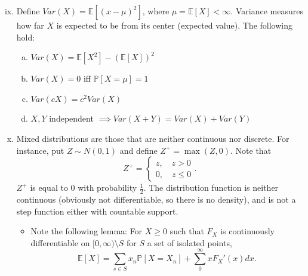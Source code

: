 \documentclass{tufte-handout}
\newcommand*\E{\mathbb{E}}
\renewcommand{\P}{\mathbb{P}}
\theoremstyle{definition}
\begin{document}
\begin{enumerate}[(i)]
	\setcounter{enumi}{8}
	\item Define $Var(X) = \E\left[\left( x - \mu \right)^2\right]$, where $\mu = \E\left[X\right] < \infty$. Variance measures how far $X$ is expected to be from its center (expected value). The following hold:
	\begin{enumerate}[(a)]
		\item $Var(X) = \E\left[X^2\right] - \left( \E\left[X\right]  \right)^2$
		\item $Var(X) = 0$ iff $\P\left[X = \mu\right] = 1$
		\item $Var(cX) = c^2 Var(X)$
		\item $X,Y$ independent $\implies Var(X+Y) = Var(X) + Var(Y)$
	\end{enumerate}
	\item Mixed distributions are those that are neither continuous nor discrete.
		For instance, put $Z \sim N(0,1)$ and define $Z^+ = \max(Z,0)$. Note that \[
		Z^+ = \begin{cases}
			z, \quad z > 0 \\
			0, \quad z \le 0
		\end{cases}
		.\] $Z^+$ is equal to $0$ with probability $\frac{1}{2}$. The distribution function is neither continuous (obviously not differentiable, so there is no density), and is not a step function either with countable support.
		\begin{itemize}
			\item Note the following lemma: For $X \ge 0$ such that $F_X$ is continuously differentiable on $[0,\infty) \setminus S$ for $S$ a set of isolated points, \[
				\E\left[X\right] = \sum\limits_{s \in S}^{} x_n \P\left[X = X_n\right]  + \sum\limits_{0}^{\infty} x F_X'(x) dx
			.\] 
		\end{itemize}


\end{enumerate}
\end{document}
